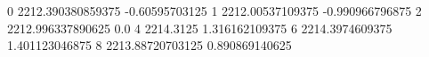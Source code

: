 0 2212.390380859375 -0.60595703125
1 2212.00537109375 -0.990966796875
2 2212.996337890625 0.0
4 2214.3125 1.316162109375
6 2214.3974609375 1.401123046875
8 2213.88720703125 0.890869140625
